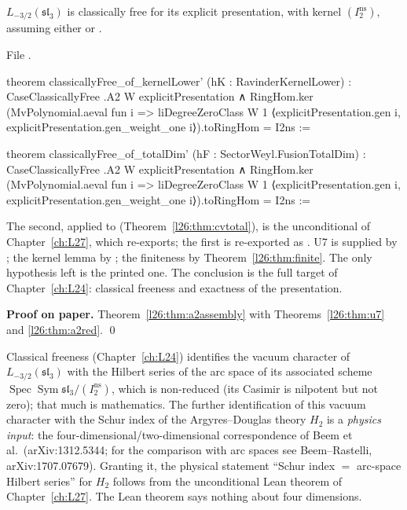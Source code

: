 \begin{theorem}\label{l26:thm:u7final}
$L_{-3/2}(\mathfrak{sl}_3)$ is classically free for its explicit presentation, with kernel $(I_2^{\mathrm{ns}})$, assuming
either  or .
\end{theorem}
\noindent File .
\begin{leancode}
theorem classicallyFree_of_kernelLower' (hK : RavinderKernelLower) :
    CaseClassicallyFree .A2 W explicitPresentation ∧
      RingHom.ker (MvPolynomial.aeval fun i =>
        liDegreeZeroClass W 1 ⟨explicitPresentation.gen i,
          explicitPresentation.gen_weight_one i⟩).toRingHom = I2ns :=

theorem classicallyFree_of_totalDim' (hF : SectorWeyl.FusionTotalDim) :
    CaseClassicallyFree .A2 W explicitPresentation ∧
      RingHom.ker (MvPolynomial.aeval fun i =>
        liDegreeZeroClass W 1 ⟨explicitPresentation.gen i,
          explicitPresentation.gen_weight_one i⟩).toRingHom = I2ns :=
\end{leancode}

\begin{dictionary}
The second, applied to  (Theorem~\ref{l26:thm:cvtotal}), is the unconditional
 of Chapter~\ref{ch:L27}, which  re-exports; the first is
re-exported as . U7 is supplied by ; the kernel lemma by ; the
finiteness by Theorem~\ref{l26:thm:finite}. The only hypothesis left is the printed one. The conclusion is the full
target of Chapter~\ref{ch:L24}: classical freeness and exactness of the presentation.
\end{dictionary}

\textbf{Proof on paper.} Theorem~\ref{l26:thm:a2assembly} with Theorems~\ref{l26:thm:u7} and \ref{l26:thm:a2red}. \qed

\begin{physics}
Classical freeness (Chapter~\ref{ch:L24}) identifies the vacuum character of $L_{-3/2}(\mathfrak{sl}_3)$ with the Hilbert series
of the arc space of its associated scheme $\operatorname{Spec}\operatorname{Sym}\mathfrak{sl}_3/(I_2^{\mathrm{ns}})$, which is
non-reduced (its Casimir is nilpotent but not zero); that much is mathematics. The further identification of this vacuum character with the Schur index of the Argyres--Douglas theory $H_2$ is a
\emph{physics input}: the four-dimensional/two-dimensional correspondence of Beem et al.\ (arXiv:1312.5344; for the comparison with
arc spaces see Beem--Rastelli, arXiv:1707.07679). Granting it, the physical statement ``Schur index $=$ arc-space Hilbert series''
for $H_2$ follows from the unconditional Lean theorem of Chapter~\ref{ch:L27}. The Lean theorem says nothing about four
dimensions.
\end{physics}

